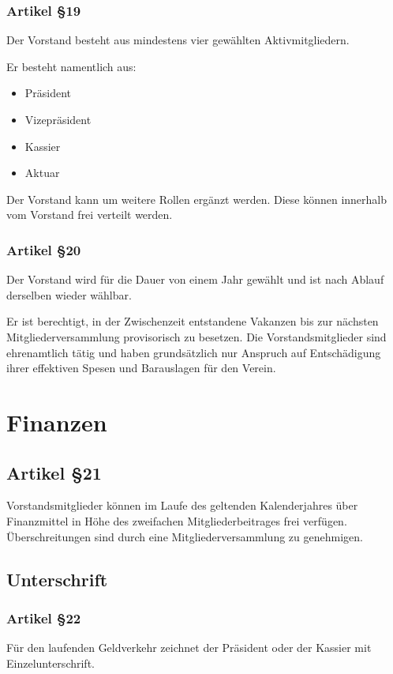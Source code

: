 \documentclass[a4paper,
               10pt,
               fleqn]{article}
\begin{document}
\subsubsection*{Artikel §19}
Der Vorstand besteht aus mindestens vier gewählten 
Aktivmitgliedern.

Er besteht namentlich aus:
\begin{itemize}
\item Präsident
\item Vizepräsident
\item Kassier
\item Aktuar
\end{itemize}

Der Vorstand kann um weitere Rollen ergänzt werden. Diese können innerhalb vom Vorstand frei verteilt werden.

 
\subsubsection*{Artikel §20}
Der Vorstand wird für die Dauer von einem Jahr gewählt und 
ist nach Ablauf derselben wieder wählbar.

Er ist berechtigt, in der Zwischenzeit entstandene Vakanzen 
bis zur nächsten Mitgliederversammlung provisorisch zu
besetzen. Die Vorstandsmitglieder sind ehrenamtlich tätig
und haben grundsätzlich nur Anspruch auf Entschädigung ihrer
effektiven Spesen und Barauslagen für den Verein.

\section{Finanzen}

\subsection*{Artikel §21}
Vorstandsmitglieder können im Laufe des geltenden 
Kalenderjahres über Finanzmittel in Höhe des zweifachen
Mitgliederbeitrages frei verfügen. Überschreitungen sind
durch eine Mitgliederversammlung zu genehmigen.

\subsection{Unterschrift}

\subsubsection*{Artikel §22}
Für den laufenden Geldverkehr zeichnet der Präsident oder 
der Kassier mit Einzelunterschrift.
\end{document}
